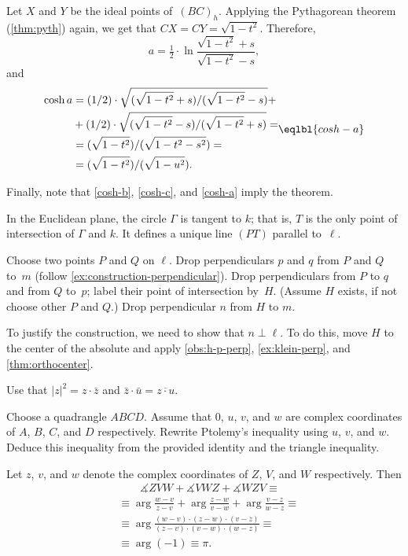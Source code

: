 Let $X$ and $Y$ be the ideal points of~$(BC)_h$.
Applying the Pythagorean theorem (\ref{thm:pyth}) again,
we get that
$CX=CY=\sqrt{1-t^2}$.
Therefore, 
\[
a
=
\tfrac12\cdot\ln\frac{\sqrt{1-t^2}+s}{\sqrt{1-t^2}-s},\]
and
\[
\begin{aligned}
\cosh a&=\tfrac12\cdot
\sqrt{\frac{\sqrt{1-t^2}+s}{\sqrt{1-t^2}-s}}+
\\
&+
\tfrac12\cdot\sqrt{\frac{\sqrt{1-t^2}-s}{\sqrt{1-t^2}+s}}=
\\
&=\frac{\sqrt{1-t^2}}{\sqrt{1-t^2-s^2}}=
\\
&=\frac{\sqrt{1-t^2}}{\sqrt{1-u^2}}.
\end{aligned}
\eqlbl{cosh-a}
\]

Finally, note that \ref{cosh-b}, \ref{cosh-c}, and \ref{cosh-a} imply the theorem.

In the Euclidean plane, the circle $\Gamma$ is tangent to $k$;
that is, $T$ is the only point of intersection of $\Gamma$ and $k$.
It defines a unique line $(PT)$ parallel to~$\ell$.

Choose two points $P$ and $Q$ on $\ell$.
Drop perpendiculars $p$ and $q$ from $P$ and $Q$ to~$m$
(follow \ref{ex:construction-perpendicular}).
Drop perpendiculars from $P$ to $q$ and from $Q$ to~$p$;
label their point of intersection by~$H$.
(Assume $H$ exists, if not choose other $P$ and $Q$.) 
Drop perpendicular $n$ from $H$ to $m$.

To justify the construction, we need to show that $n\perp \ell$.
To do this, move $H$ to the center of the absolute and apply \ref{obs:h-p-perp}, \ref{ex:klein-perp}, and \ref{thm:orthocenter}.

\setcounter{eqtn}{0}

 Use that $|z|^2=z\cdot \bar z$ and $\bar z\cdot \bar u=\overline{z\cdot u}$.

Choose a quadrangle $ABCD$.
Assume that $0$, $u$, $v$, and $w$ are complex coordinates of $A$, $B$, $C$, and $D$ respectively.
Rewrite Ptolemy's inequality using $u$, $v$, and $w$.
Deduce this inequality from the provided identity and the triangle inequality.


Let $z$, $v$, and $w$ denote the complex coordinates of $Z$, $V$, and $W$ respectively.
Then 
\begin{align*}
&\qquad \measuredangle ZVW+\measuredangle VWZ+\measuredangle WZV\equiv
\\
&\equiv
\arg \tfrac{w-v}{z-v}+\arg \tfrac{z-w}{v-w}+\arg \tfrac{v-z}{w-z}\equiv
\\
&\equiv
\arg \tfrac{(w-v)\cdot(z-w)\cdot(v-z)}{(z-v)\cdot(v-w)\cdot(w-z)}\equiv
\\
&\equiv\arg (-1)\equiv
\pi.
\end{align*}

